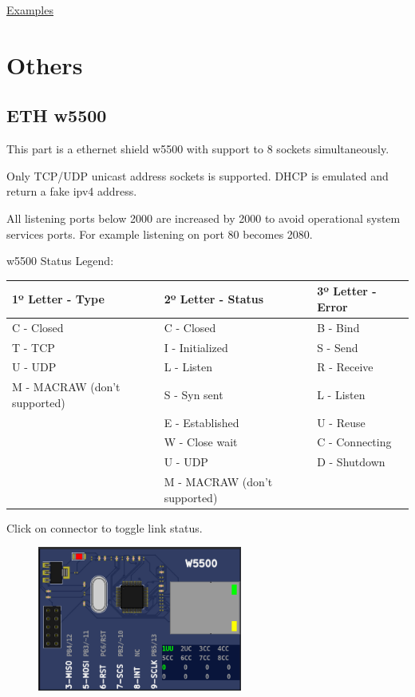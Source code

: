 \href{https://lcgamboa.github.io/picsimlab_examples/examples/examples_index.html\#Step\_motor}{Examples}



\section{Others}


\subsection{ETH w5500}

This part is a ethernet shield w5500 with support to 8 sockets simultaneously.

Only TCP/UDP unicast address sockets is supported. 
DHCP is emulated and return a fake ipv4 address.

All listening ports below 2000 are increased by 2000 to avoid operational system services ports. 
For example listening on port 80 becomes 2080. 

w5500 Status Legend:
\begin{center}
\begin{tabular}{l|l|l}
\hline \textbf{1º Letter - Type} & \textbf{2º Letter - Status} & \textbf{3º Letter - Error}\\
\hline
\hline C - Closed & C - Closed & B - Bind\\
\hline T - TCP & I - Initialized & S - Send\\
\hline U - UDP & L - Listen & R - Receive\\
\hline M - MACRAW (don't supported) & S - Syn sent & L - Listen\\
\hline   & E - Established & U - Reuse\\
\hline   & W - Close wait & C - Connecting\\
\hline   & U - UDP & D - Shutdown\\
\hline   & M - MACRAW (don't supported) &   \\
\hline
\end{tabular}
\end{center}

Click on connector to toggle link status.

\begin{figure}[H]
\center
\includegraphics[width=0.6\textwidth]{img/part_w5500.png} 
\end{figure} 

